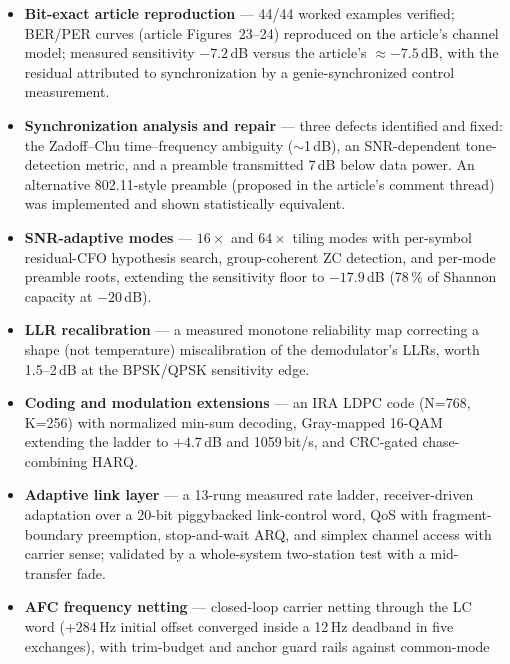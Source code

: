 \begin{itemize}
    \item \textbf{Bit-exact article reproduction} --- 44/44 worked
          examples verified; BER/PER curves (article Figures~23--24)
          reproduced on the article's channel model; measured
          sensitivity $-7.2$\,dB versus the article's
          $\approx-7.5$\,dB, with the residual attributed to
          synchronization by a genie-synchronized control measurement.
    \item \textbf{Synchronization analysis and repair} --- three
          defects identified and fixed: the Zadoff--Chu
          time--frequency ambiguity ($\sim$1\,dB), an SNR-dependent
          tone-detection metric, and a preamble transmitted 7\,dB
          below data power.  An alternative 802.11-style preamble
          (proposed in the article's comment thread) was implemented
          and shown statistically equivalent.
    \item \textbf{SNR-adaptive modes} --- $16\times$ and $64\times$
          tiling modes with per-symbol residual-CFO hypothesis search,
          group-coherent ZC detection, and per-mode preamble roots,
          extending the sensitivity floor to $-17.9$\,dB (78\,\% of
          Shannon capacity at $-20$\,dB).
    \item \textbf{LLR recalibration} --- a measured monotone
          reliability map correcting a shape (not temperature)
          miscalibration of the demodulator's LLRs, worth 1.5--2\,dB
          at the BPSK/QPSK sensitivity edge.
    \item \textbf{Coding and modulation extensions} --- an IRA LDPC
          code (N=768, K=256) with normalized min-sum decoding,
          Gray-mapped 16-QAM extending the ladder to $+4.7$\,dB and
          1059\,bit/s, and CRC-gated chase-combining HARQ.
    \item \textbf{Adaptive link layer} --- a 13-rung measured rate
          ladder, receiver-driven adaptation over a 20-bit piggybacked
          link-control word, QoS with fragment-boundary preemption,
          stop-and-wait ARQ, and simplex channel access with carrier
          sense; validated by a whole-system two-station test with a
          mid-transfer fade.
    \item \textbf{AFC frequency netting} --- closed-loop carrier
          netting through the LC word ($+284$\,Hz initial offset
          converged inside a 12\,Hz deadband in five exchanges), with
          trim-budget and anchor guard rails against common-mode

\end{itemize}
